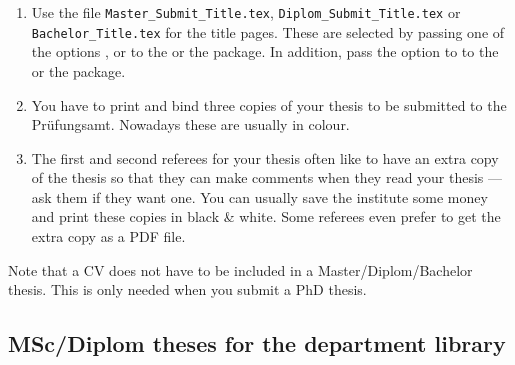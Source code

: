 \begin{enumerate}
\item Use the file \texttt{Master\_Submit\_Title.tex},
  \texttt{Diplom\_Submit\_Title.tex} or\\
  \texttt{Bachelor\_Title.tex} for the title pages.
  These are selected by passing one of the options
  ,  or 
  to the  or the  package.
  In addition, pass the option  to 
  to the  or the  package.
\item You have to print and bind three copies of your thesis
  to be submitted to the
  \foreignlanguage{ngerman}{Prüfungsamt}. Nowadays these are usually in
  colour.
\item The first and second referees for your thesis often like to
  have an extra copy of the thesis so that they can make comments when they read
  your thesis --- ask them if they want one. You can usually save the
  institute some money and print these copies in black \& white.
  Some referees even prefer to get the extra copy as a PDF file.
\end{enumerate}

Note that a CV does not have to be included in a Master/Diplom/Bachelor
thesis. This is only needed when you submit a PhD thesis.


\subsection{MSc/Diplom theses for the department library}

